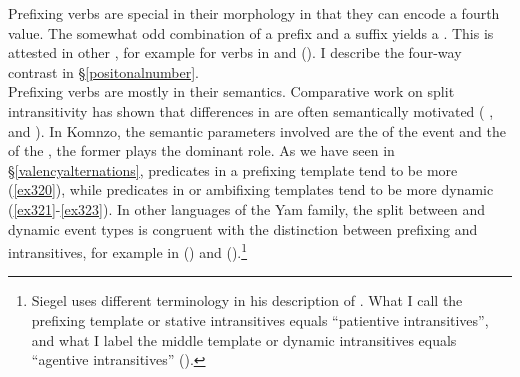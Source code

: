
Prefixing verbs are special in their morphology in that they can encode a fourth  value. The somewhat odd combination of a  prefix and a  suffix yields a . This is attested in other , for example for  verbs in  and  (\citealt{Evans:2014bz}). I describe the four-way  contrast in \S{}\ref{positonalnumber}.\\

Prefixing verbs are mostly  in their semantics. Comparative work on split intransitivity has shown that differences in  are often semantically motivated ( \citealt{Merlan:1985tu}, \citealt{Mithun:1991wu} and \citealt{Arkadiev:2008vq}). In Komnzo, the semantic parameters involved are the  of the event and the  of the , the former plays the dominant role. As we have seen in \S\ref{valencyalternations}, predicates in a prefixing template tend to be more  (\ref{ex320}), while predicates in  or ambifixing templates tend to be more dynamic (\ref{ex321}-\ref{ex323}). In other languages of the Yam family, the split between  and dynamic event types is congruent with the distinction between prefixing and  intransitives, for example in  (\citealt{Evans:2015to}) and  (\citealt{Siegel:2015bp}).\footnote{Siegel uses different terminology in his description of . What I call the prefixing template or stative intransitives equals ``patientive intransitives'', and what I label the middle template or dynamic intransitives equals ``agentive intransitives'' (\citealt[213]{Siegel:2015bp}).}\\

